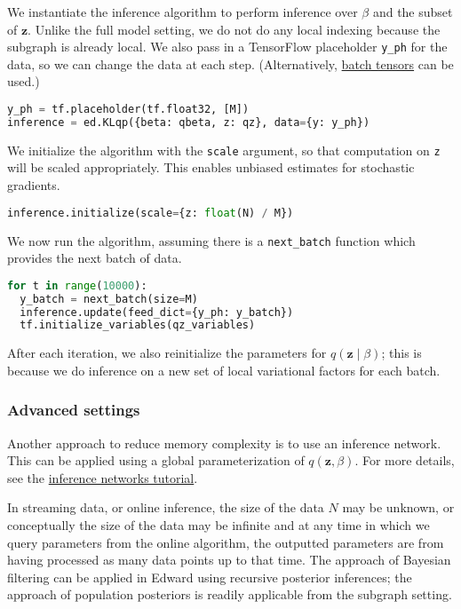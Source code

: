 We instantiate the inference algorithm to perform inference over
$\beta$ and the subset of $\mathbf{z}$.
Unlike the full model setting, we do not do any local indexing because
the subgraph is already local.
We also pass in a TensorFlow placeholder \texttt{y_ph} for the data,
so we can change the data at each step. (Alternatively,
\href{/api/data}{batch tensors} can be used.)
\begin{lstlisting}[language=Python]
y_ph = tf.placeholder(tf.float32, [M])
inference = ed.KLqp({beta: qbeta, z: qz}, data={y: y_ph})
\end{lstlisting}
We initialize the algorithm with the \texttt{scale} argument, so that
computation on \texttt{z} will be scaled appropriately.
This enables unbiased estimates for stochastic gradients.
\begin{lstlisting}[language=Python]
inference.initialize(scale={z: float(N) / M})
\end{lstlisting}
We now run the algorithm, assuming there is a \texttt{next_batch}
function which provides the next batch of data.
\begin{lstlisting}[language=Python]
for t in range(10000):
  y_batch = next_batch(size=M)
  inference.update(feed_dict={y_ph: y_batch})
  tf.initialize_variables(qz_variables)
\end{lstlisting}
After each iteration, we also reinitialize the parameters for
$q(\mathbf{z}\mid\beta)$; this is because we do inference on a new
set of local variational factors for each batch.

\subsubsection{Advanced settings}

Another approach to reduce memory complexity is to use an inference
network. This can be applied using a global parameterization of
$q(\mathbf{z}, \beta)$. For more details, see the
\href{/tutorials/inference-networks}{inference networks tutorial}.

In streaming data, or online inference, the size of the data $N$
may be unknown, or conceptually the size of the data may be
infinite and at any time in which we query parameters from the online
algorithm, the outputted parameters are from having processed as many
data points up to that time.
The approach of Bayesian filtering
\citep{doucet2000on,broderick2013streaming} can be applied in Edward using
recursive posterior inferences; the approach of population posteriors
\citep{mcinerney2015population} is readily applicable from the subgraph
setting.

